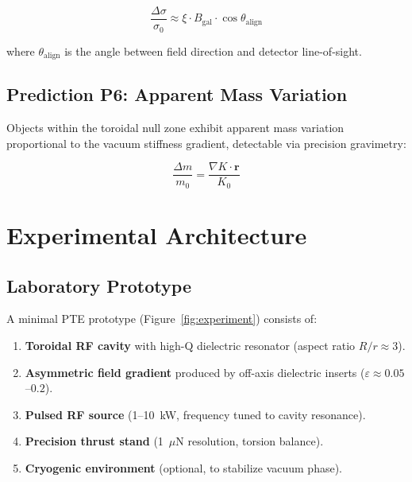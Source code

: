 \documentclass[12pt,a4paper]{article}
\begin{document}
\begin{equation}
\frac{\Delta\sigma}{\sigma_0} \approx \xi \cdot B_{\text{gal}} \cdot \cos\theta_{\text{align}}
\label{eq:P5}
\end{equation}

where $\theta_{\text{align}}$ is the angle between field direction and detector line-of-sight.

\subsection{Prediction P6: Apparent Mass Variation}

Objects within the toroidal null zone exhibit apparent mass variation proportional to the vacuum stiffness gradient, detectable via precision gravimetry:

\begin{equation}
\frac{\Delta m}{m_0} = \frac{\nabla K \cdot \mathbf{r}}{K_0}
\label{eq:P6}
\end{equation}

\section{Experimental Architecture}
\label{sec:experiment}

\subsection{Laboratory Prototype}

A minimal PTE prototype (Figure~\ref{fig:experiment}) consists of:

\begin{enumerate}
    \item \textbf{Toroidal RF cavity} with high-Q dielectric resonator (aspect ratio $R/r \approx 3$).
    \item \textbf{Asymmetric field gradient} produced by off-axis dielectric inserts ($\varepsilon \approx 0.05$--$0.2$).
    \item \textbf{Pulsed RF source} (1--10~kW, frequency tuned to cavity resonance).
    \item \textbf{Precision thrust stand} (1~$\mu$N resolution, torsion balance).
    \item \textbf{Cryogenic environment} (optional, to stabilize vacuum phase).
\end{enumerate}
\end{document}
